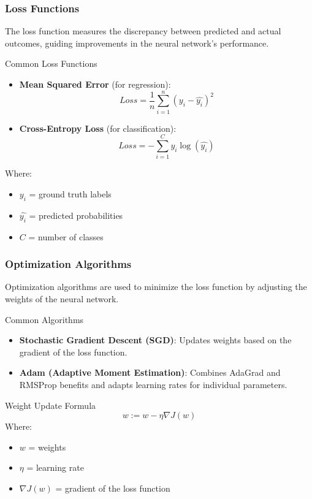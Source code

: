 \documentclass[aspectratio=169]{beamer}
\begin{document}
\begin{frame}[fragile]
    \frametitle{Loss Functions}
    The loss function measures the discrepancy between predicted and actual outcomes, guiding improvements in the neural network’s performance.
    
    \begin{block}{Common Loss Functions}
        \begin{itemize}
            \item \textbf{Mean Squared Error} (for regression):
            \begin{equation}
                Loss = \frac{1}{n} \sum_{i=1}^{n} (y_i - \hat{y_i})^2
            \end{equation}
            \item \textbf{Cross-Entropy Loss} (for classification):
            \begin{equation}
                Loss = -\sum_{i=1}^{C} y_i \log(\hat{y_i})
            \end{equation}
        \end{itemize}
        Where:
        \begin{itemize}
            \item $y_i$ = ground truth labels
            \item $\hat{y_i}$ = predicted probabilities
            \item $C$ = number of classes
        \end{itemize}
    \end{block}
\end{frame}

\begin{frame}[fragile]
    \frametitle{Optimization Algorithms}
    Optimization algorithms are used to minimize the loss function by adjusting the weights of the neural network.

    \begin{block}{Common Algorithms}
        \begin{itemize}
            \item \textbf{Stochastic Gradient Descent (SGD)}: Updates weights based on the gradient of the loss function.
            \item \textbf{Adam (Adaptive Moment Estimation)}: Combines AdaGrad and RMSProp benefits and adapts learning rates for individual parameters.
        \end{itemize}
    \end{block}

    \begin{block}{Weight Update Formula}
        \begin{equation}
            w := w - \eta \nabla J(w)
        \end{equation}
        Where:
        \begin{itemize}
            \item $w$ = weights
            \item $\eta$ = learning rate
            \item $\nabla J(w)$ = gradient of the loss function
        \end{itemize}
    \end{block}
\end{frame}
\end{document}
